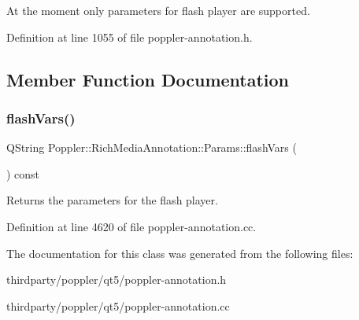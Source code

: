 At the moment only parameters for flash player are supported. 

Definition at line 1055 of file poppler-\/annotation.\+h.



\subsection{Member Function Documentation}
\mbox{\label{class_poppler_1_1_rich_media_annotation_1_1_params_a9f8246894a1fe172f8bb546f7282167e}} 
\subsubsection{\texorpdfstring{flash\+Vars()}{flashVars()}}
{\footnotesize\ttfamily Q\+String Poppler\+::\+Rich\+Media\+Annotation\+::\+Params\+::flash\+Vars (\begin{DoxyParamCaption}{ }\end{DoxyParamCaption}) const}

Returns the parameters for the flash player. 

Definition at line 4620 of file poppler-\/annotation.\+cc.



The documentation for this class was generated from the following files\+:\begin{DoxyCompactItemize}
\item 
thirdparty/poppler/qt5/poppler-\/annotation.\+h\item 
thirdparty/poppler/qt5/poppler-\/annotation.\+cc\end{DoxyCompactItemize}
